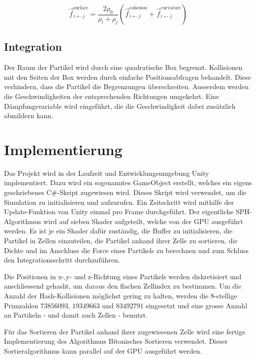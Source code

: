 \documentclass[a4paper]{paper}
\begin{document}
\begin{equation}
	\label{surface_tension}
	\vec{f}_{i\leftarrow j}^{\text{surface}} = \frac{2\rho_{0}}{\rho_{i}+\rho_{j}} (\vec{f}_{i\leftarrow j}^{\text{cohesion}} + \vec{f}_{i\leftarrow j}^{\text{curvature}})
\end{equation}


\subsection{Integration}

Der Raum der Partikel wird durch eine quadratische Box begrenzt. Kollisionen mit den Seiten der Box werden durch einfache Positionsabfragen behandelt. Diese verhindern, dass die Partikel die Begrenzungen überschreiten. Ausserdem werden die Geschwindigkeiten der entsprechenden Richtungen umgekehrt. Eine Dämpfungsvariable wird eingeführt, die die Geschwindigkeit dabei zusätzlich abmildern kann.

\section{Implementierung}
Das Projekt wird in der Laufzeit und Entwicklungsumgebung Unity implementiert. Dazu wird ein sogenanntes GameObject erstellt, welches ein eigens geschriebenes C\#-Skript zugewiesen wird. Dieses Skript wird verwendet, um die Simulation zu initialisieren und aufzurufen. %
Ein Zeitschritt wird mithilfe der Update-Funktion von Unity einmal pro Frame durchgeführt. Der eigentliche SPH-Algorithmus wird auf sieben Shader aufgeteilt, welche von der GPU ausgeführt werden. Es ist je ein Shader dafür zuständig, die Buffer zu initialisieren, die Partikel in Zellen einzuteilen, die Partikel anhand ihrer Zelle zu sortieren, die Dichte und im Anschluss die Force eines Partikels zu berechnen und zum Schluss den Integrationsschritt durchzuführen.

Die Positionen in x-,y- und z-Richtung eines Partikels werden diskretisiert und anschliessend gehasht, um daraus den flachen Zellindex zu bestimmen. Um die Anzahl der Hash-Kollisionen möglichst gering zu halten, werden die 8-stellige Primzahlen $73856093$, $19349663$ und $83492791$ eingesetzt und eine grosse Anzahl an Partikeln - und damit auch Zellen - benutzt.

Für das Sortieren der Partikel anhand ihrer zugewiesenen Zelle wird eine fertige Implementierung des Algorithmus Bitonisches Sortieren verwendet. Dieser Sortieralgorithmus kann parallel auf der GPU ausgeführt werden.
\end{document}
